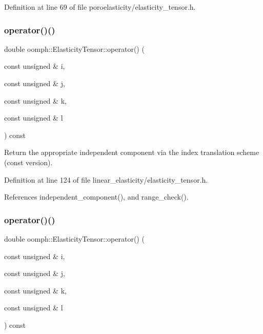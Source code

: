 Definition at line 69 of file poroelasticity/elasticity\+\_\+tensor.\+h.

\mbox{\label{classoomph_1_1ElasticityTensor_a60e0ebb9f03c21d11aa874dfdf5437ae}} 
\subsubsection{\texorpdfstring{operator()()}{operator()()}\hspace{0.1cm}{\footnotesize\ttfamily [1/2]}}
{\footnotesize\ttfamily double oomph\+::\+Elasticity\+Tensor\+::operator() (\begin{DoxyParamCaption}\item[{const unsigned \&}]{i,  }\item[{const unsigned \&}]{j,  }\item[{const unsigned \&}]{k,  }\item[{const unsigned \&}]{l }\end{DoxyParamCaption}) const\hspace{0.3cm}{\ttfamily [inline]}}



Return the appropriate independent component via the index translation scheme (const version). 



Definition at line 124 of file linear\+\_\+elasticity/elasticity\+\_\+tensor.\+h.



References independent\+\_\+component(), and range\+\_\+check().

\mbox{\label{classoomph_1_1ElasticityTensor_a60e0ebb9f03c21d11aa874dfdf5437ae}} 
\subsubsection{\texorpdfstring{operator()()}{operator()()}\hspace{0.1cm}{\footnotesize\ttfamily [2/2]}}
{\footnotesize\ttfamily double oomph\+::\+Elasticity\+Tensor\+::operator() (\begin{DoxyParamCaption}\item[{const unsigned \&}]{i,  }\item[{const unsigned \&}]{j,  }\item[{const unsigned \&}]{k,  }\item[{const unsigned \&}]{l }\end{DoxyParamCaption}) const\hspace{0.3cm}{\ttfamily [inline]}}



